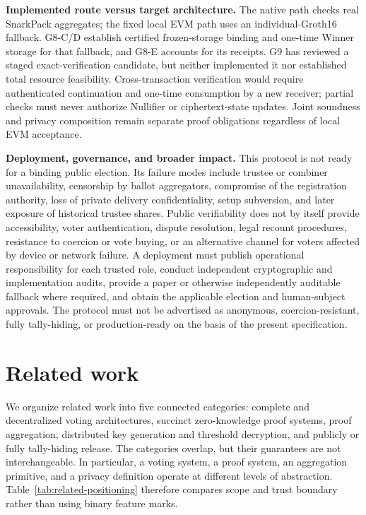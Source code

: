 \documentclass[pdflatex,sn-mathphys-num]{sn-jnl}%
\theoremstyle{thmstyleone}%
\theoremstyle{thmstyletwo}%
\theoremstyle{thmstylethree}%
\begin{document}
\textbf{Implemented route versus target architecture.} The native path
checks real SnarkPack aggregates; the fixed local EVM path uses an
individual-Groth16 fallback. G8-C/D establish certified frozen-storage
binding and one-time Winner storage for that fallback, and G8-E accounts
for its receipts. G9 has reviewed a staged exact-verification candidate,
but neither implemented it nor established total resource feasibility.
Cross-transaction verification would require authenticated continuation and
one-time consumption by a new receiver; partial checks must never authorize
Nullifier or ciphertext-state updates. Joint soundness and privacy composition
remain separate proof obligations regardless of local EVM acceptance.

\textbf{Deployment, governance, and broader impact.}  This protocol is not
ready for a binding public election.  Its failure modes include trustee or
combiner unavailability, censorship by ballot aggregators, compromise of the
registration authority, loss of private delivery confidentiality, setup
subversion, and later exposure of historical trustee shares.  Public
verifiability does not by itself provide accessibility, voter authentication,
dispute resolution, legal recount procedures, resistance to coercion or vote
buying, or an alternative channel for voters affected by device or network
failure.  A deployment must publish operational responsibility for each
trusted role, conduct independent cryptographic and implementation audits,
provide a paper or otherwise independently auditable fallback where required,
and obtain the applicable election and human-subject approvals.  The protocol
must not be advertised as anonymous, coercion-resistant, fully tally-hiding,
or production-ready on the basis of the present specification.

\section{Related work}\label{sec7}

We organize related work into five connected categories: complete and
decentralized voting architectures, succinct zero-knowledge proof systems,
proof aggregation, distributed key generation and threshold decryption, and
publicly or fully tally-hiding release.  The categories overlap, but their
guarantees are not interchangeable.  In particular, a voting system, a proof
system, an aggregation primitive, and a privacy definition operate at
different levels of abstraction.  Table~\ref{tab:related-positioning}
therefore compares scope and trust boundary rather than using binary feature
marks.
\end{document}
